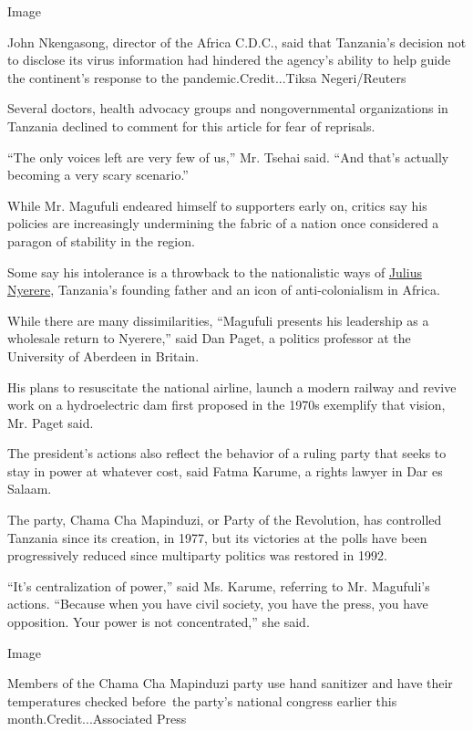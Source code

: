Image

John Nkengasong, director of the Africa C.D.C., said that Tanzania's
decision not to disclose its virus information had hindered the agency's
ability to help guide the continent's response to the
pandemic.Credit...Tiksa Negeri/Reuters

Several doctors, health advocacy groups and nongovernmental
organizations in Tanzania declined to comment for this article for fear
of reprisals.

``The only voices left are very few of us,'' Mr. Tsehai said. ``And
that's actually becoming a very scary scenario.''

While Mr. Magufuli endeared himself to supporters early on, critics say
his policies are increasingly undermining the fabric of a nation once
considered a paragon of stability in the region.

Some say his intolerance is a throwback to the nationalistic ways of
\href{https://www.nytimes3xbfgragh.onion/1999/10/15/world/julius-nyerere-of-tanzania-dies-preached-african-socialism-to-the-world.html}{Julius
Nyerere}, Tanzania's founding father and an icon of anti-colonialism in
Africa.

While there are many dissimilarities, ``Magufuli presents his leadership
as a wholesale return to Nyerere,'' said Dan Paget, a politics professor
at the University of Aberdeen in Britain.

His plans to resuscitate the national airline, launch a modern railway
and revive work on a hydroelectric dam first proposed in the 1970s
exemplify that vision, Mr. Paget said.

The president's actions also reflect the behavior of a ruling party that
seeks to stay in power at whatever cost, said Fatma Karume, a rights
lawyer in Dar es Salaam.

The party, Chama Cha Mapinduzi, or Party of the Revolution, has
controlled Tanzania since its creation, in 1977, but its victories at
the polls have been progressively reduced since multiparty politics was
restored in 1992.

``It's centralization of power,'' said Ms. Karume, referring to Mr.
Magufuli's actions. ``Because when you have civil society, you have the
press, you have opposition. Your power is not concentrated,'' she said.

Image

Members of the Chama Cha Mapinduzi party use hand sanitizer and have
their temperatures checked before~the party's national congress earlier
this month.Credit...Associated Press

